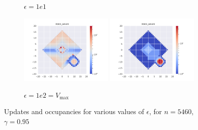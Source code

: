 \documentclass[runningheads]{llncs}
\begin{document}
\begin{figure}[H]
\begin{subfigure}[b]{\textwidth}
        \caption{$\epsilon=1e1$}
    \end{subfigure}
    \begin{subfigure}[b]{\textwidth}
        \centering
        \includegraphics[width=0.49\textwidth]{img/epsilon/1e2/updates_state_aware.pdf}
        \includegraphics[width=0.49\textwidth]{img/epsilon/1e2/occupations_state_aware.pdf}
        \caption{$\epsilon=1e2 = V_{\max}$}
    \end{subfigure}
    \caption{Updates and occupancies for various values of $\epsilon$, for $n = 5460$, $\gamma=0.95$}
\end{figure}
\end{document}
